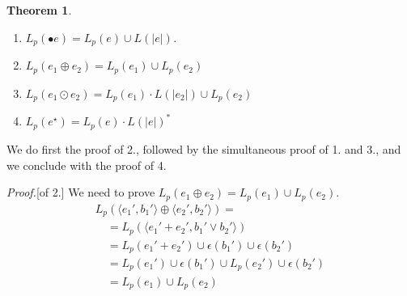 \documentclass[preprint]{sigplanconf}
\newcommand{\varoast}{\star}
\newcommand{\Le}[1]{L(#1)}
\newcommand{\Lp}[1]{L_p(#1)}
\newcounter{item}
\newtheorem{theorem}[item]{Theorem}
\newenvironment{proof}{\begin{trivlist}\item[]{\em Proof.}}{\end{trivlist}}
\begin{document}
\begin{theorem}
\label{theo:broadcast}~
\begin{enumerate}
\item $\Lp{\bullet e} = \Lp e \cup \Le{|e|}$.
\item $L_p(e_1 \oplus e_2) = L_p(e_1) \cup L_p(e_2)$
\item $L_p(e_1 \odot e_2) = L_p(e_1) \cdot L(|e_2|) \cup  L_p(e_2)$
\item $L_p(e^\varoast) = L_p(e) \cdot L(|e|)^*$
\end{enumerate}
\end{theorem}
We do first the proof of 2., followed by the simultaneous proof of 1. and 3.,
and we conclude with the proof of 4.
\begin{proof}[of 2.]
We need to prove $L_p(e_1 \oplus e_2) = L_p(e_1) \cup L_p(e_2)$.
\[\begin{array}{l}
L_p(\langle e_1',b_1'\rangle \oplus \langle e_2',b_2' \rangle) =\\
\quad = L_p(\langle e_1' + e_2', b_1' \vee b_2' \rangle)\\
\quad = L_p(e_1' + e_2') \cup \epsilon(b_1') \cup \epsilon(b_2')\\
\quad = L_p(e_1')\cup \epsilon(b_1')  \cup L_p(e_2') \cup \epsilon(b_2')\\
\quad = L_p(e_1) \cup L_p(e_2)
\end{array}
\]
\end{proof}
\end{document}
